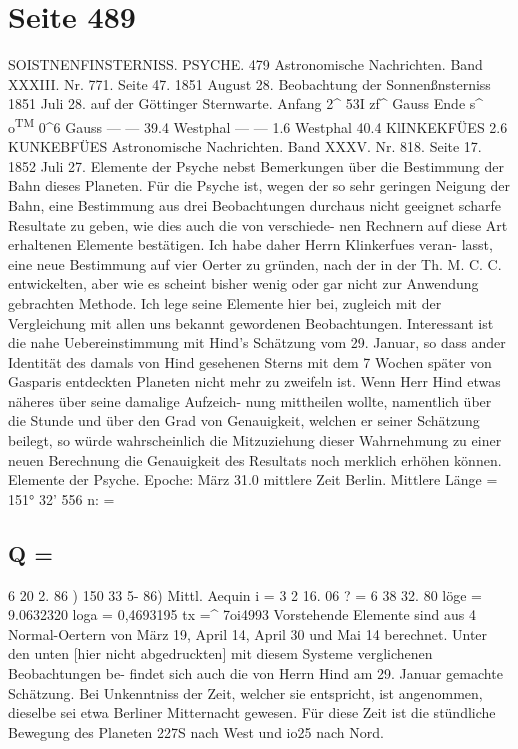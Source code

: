 \documentclass[10pt,a4paper]{article}
\begin{document}
\newpage
\section*{Seite 489}

SOISTNENFINSTERNISS.    PSYCHE.  479
Astronomische  Nachrichten.    Band  XXXIII.  Nr.  771.  Seite  47.     1851  August  28.
Beobachtung  der  Sonnenßnsterniss  1851  Juli  28.  auf  der  Göttinger  Sternwarte.
Anfang     2\textasciicircum{}  53I\glqq{}  zf\textasciicircum{}  Gauss  Ende     s\textasciicircum{}  o\textsuperscript{TM}  0\textasciicircum{}6  Gauss
---  ---     39.4  Westphal  ---  ---     1.6  Westphal
40.4    KlINKEKFÜES               2.6    KUNKEBFÜES
Astronomische  Nachrichten.     Band  XXXV.   Nr.  818.  Seite  17.     1852  Juli  27.
Elemente  der  Psyche  nebst  Bemerkungen  über  die  Bestimmung  der  Bahn  dieses  Planeten.
Für  die  Psyche  ist,  wegen  der  so  sehr  geringen  Neigung  der  Bahn,  eine  Bestimmung  aus  drei
Beobachtungen  durchaus  nicht  geeignet  scharfe  Resultate  zu  geben,  wie  dies  auch  die  von  verschiede-
nen Rechnern  auf  diese  Art  erhaltenen  Elemente  bestätigen.  Ich  habe  daher  Herrn  Klinkerfues  veran-
lasst, eine  neue  Bestimmung  auf  vier  Oerter  zu  gründen,  nach  der  in  der  Th.  M.  C.  C.  entwickelten,
aber  wie  es  scheint  bisher  wenig  oder  gar  nicht  zur  Anwendung  gebrachten  Methode.  Ich  lege  seine
Elemente  hier  bei,  zugleich  mit  der  Vergleichung  mit  allen  uns  bekannt  gewordenen  Beobachtungen.
Interessant  ist  die  nahe  Uebereinstimmung  mit  Hind's  Schätzung  vom  29.  Januar,  so  dass  ander
Identität  des  damals  von  Hind  gesehenen  Sterns  mit  dem  7  Wochen  später  von  Gasparis  entdeckten
Planeten  nicht  mehr  zu  zweifeln  ist.  Wenn  Herr  Hind  etwas  näheres  über  seine  damalige  Aufzeich-
nung mittheilen  wollte,  namentlich  über  die  Stunde  und  über  den  Grad  von  Genauigkeit,  welchen  er
seiner  Schätzung  beilegt,  so  würde  wahrscheinlich  die  Mitzuziehung  dieser  Wahrnehmung  zu  einer  neuen
Berechnung  die  Genauigkeit  des  Resultats  noch  merklich  erhöhen  können.
Elemente  der  Psyche.
Epoche:  März  31.0  mittlere  Zeit  Berlin.
Mittlere  Länge  =  151°  32'    5\glqq{}56
\textbullet{}n:  =
\subsection*{Q  =}

6     20     2. 86 )
150     33     5- 86)
Mittl.  Aequin
i  =
3       2   16.  06
?  =
6     38  32. 80
löge  =
9.0632320
loga  =
0,4693195
tx  =\textasciicircum{}
7oi\glqq{}4993
Vorstehende  Elemente  sind  aus  4  Normal-Oertern  von  März  19,  April  14,  April  30  und  Mai  14
berechnet.
Unter  den  unten  [hier  nicht  abgedruckten]  mit  diesem  Systeme  verglichenen  Beobachtungen  be-
findet sich  auch  die  von  Herrn  Hind  am  29.  Januar  gemachte  Schätzung.  Bei  Unkenntniss  der  Zeit,
welcher  sie  entspricht,  ist  angenommen,  dieselbe  sei  etwa  Berliner  Mitternacht  gewesen.  Für  diese  Zeit
ist  die  stündliche  Bewegung  des  Planeten  22\glqq{}7S  nach  West  und  io\glqq{}25  nach  Nord.
\end{document}
